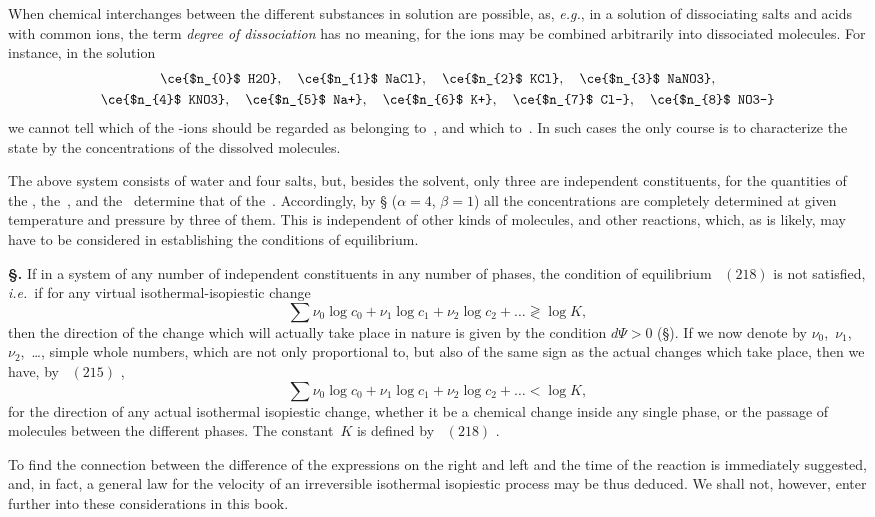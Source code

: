 \documentclass[12pt]{book}[2005/09/16]
\newcommand{\Section}[1]{
  \medskip\par\textbf{§\;#1}
  \label{section:#1}
}
\newcommand{\SecRef}[2][§\;]{\hyperref[section:#2.]{{\upshape #1#2}}}
\newcommand{\Eq}[1]{%
  \hyperref[eqn:#1]{\ensuremath{#1}}%
}
\newcommand{\PageSep}[1]{\ignorespaces}
\newcommand{\eg}{\emph{e.g.}}
\newcommand{\ie}{\emph{i.e.}}
\newcommand{\tsum}{\mathop{\textstyle\sum}\limits}
\begin{document}
When chemical interchanges between the different substances
in solution are possible, as, \eg, in a solution of dissociating
salts and acids with common ions, the term \emph{degree
of dissociation} has no meaning, for the ions may be combined
arbitrarily into dissociated molecules. For instance, in the
solution
\begin{multline*}
\ce{$n_{0}$ H2O},\quad
\ce{$n_{1}$ NaCl},\quad
\ce{$n_{2}$ KCl},\quad
\ce{$n_{3}$ NaNO3}, \\
\ce{$n_{4}$ KNO3},\quad
\ce{$n_{5}$ Na+},\quad
\ce{$n_{6}$ K+},\quad
\ce{$n_{7}$ Cl-},\quad
\ce{$n_{8}$ NO3-}
\end{multline*}
we cannot tell which of the -ions should be regarded as
belonging to~, and which to~. In such cases
the only course is to characterize the state by the concentrations
of the dissolved molecules.

The above system consists of water and four salts, but,
besides the solvent, only three are independent constituents,
for the quantities of the , the~, and the~ determine
that of the~. Accordingly, by \SecRef{204} ($\alpha = 4$, $\beta = 1$) all
the concentrations are completely determined at given
temperature and pressure by three of them. This is independent
of other kinds of molecules, and other reactions,
which, as is likely, may have to be considered in establishing
the conditions of equilibrium.

\Section{280.} If in a system of any number of independent
\PageSep{263}
constituents in any number of phases, the condition of
equilibrium~\Eq{(218)} is not satisfied, \ie\ if for any virtual
isothermal-isopiestic change
\[
\tsum \nu_{0} \log c_{0} + \nu_{1} \log c_{1} + \nu_{2} \log c_{2} + \dots \gtrless \log K,
\]
then the direction of the change which will actually take
place in nature is given by the condition $d\Psi > 0$ (\SecRef{147}).
If we now denote by $\nu_{0}$,~$\nu_{1}$, $\nu_{2}$,~\dots, simple whole numbers,
which are not only proportional to, but also of the same
sign as the actual changes which take place, then we have,
by~\Eq{(215)},
\[
\tsum \nu_{0} \log c_{0} + \nu_{1} \log c_{1} + \nu_{2} \log c_{2} + \dots < \log K,
\]
for the direction of any actual isothermal isopiestic change,
whether it be a chemical change inside any single phase, or
the passage of molecules between the different phases. The
constant~$K$ is defined by~\Eq{(218)}.

To find the connection between the difference of the
expressions on the right and left and the time of the reaction
is immediately suggested, and, in fact, a general law for the
velocity of an irreversible isothermal isopiestic process may
be thus deduced. We shall not, however, enter further into
these considerations in this book.
%
%
\PageSep{264}
\end{document}
